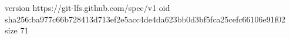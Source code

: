 version https://git-lfs.github.com/spec/v1
oid sha256:ba977c66b728413d713ef2e5acc4de4da623bb0d3bf5fca25cefc66106e91f02
size 71
